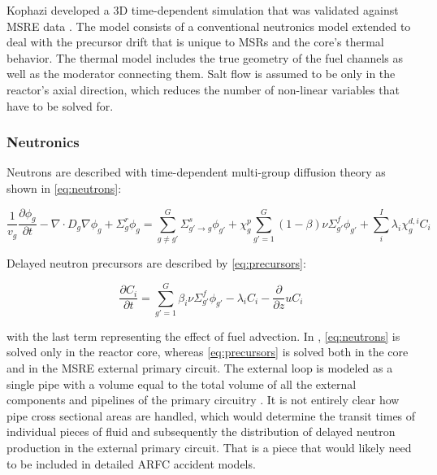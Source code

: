\documentclass{article}
\let\Oldsubsubsection\subsubsection
\renewcommand{\subsubsection}{\FloatBarrier\Oldsubsubsection}
\begin{document}
Kophazi developed a 3D time-dependent simulation that was validated against \gls{MSRE}
data \cite{kophazi_development_2009}. The model consists of a conventional
neutronics model extended to deal with the precursor drift that is unique to
MSRs and the core's thermal behavior. The thermal model includes the true
geometry of the fuel channels as well as the moderator connecting them. Salt
flow is assumed to be only in the reactor's axial direction, which reduces the
number of non-linear variables that have to be solved for.

\subsubsection{Neutronics}

Neutrons are described with time-dependent multi-group diffusion theory as shown
in \cref{eq:neutrons}:

\begin{equation}
\frac{1}{v_g}\frac{\partial \phi_g}{\partial t} - \nabla \cdot D_g \nabla \phi_g
+ \Sigma_g^r \phi_g = \sum_{g \ne g'}^G \Sigma_{g'\rightarrow g}^s \phi_{g'} + \chi_g^p \sum_{g' = 1}^G (1 - \beta)
\nu \Sigma_{g'}^f \phi_{g'} + \sum_i^I \lambda_i \chi_g^{d,i} C_i
\label{eq:neutrons}
\end{equation}

Delayed neutron precursors are described by \cref{eq:precursors}:

\begin{equation}
\frac{\partial C_i}{\partial t} = \sum_{g'= 1}^G \beta_i \nu \Sigma_{g'}^f
\phi_{g'} - \lambda_i C_i - \frac{\partial}{\partial z} u C_i
\label{eq:precursors}
\end{equation}

with the last term representing the effect of fuel advection. In
\cite{kophazi_development_2009}, \cref{eq:neutrons} is solved only in the
reactor core, whereas \cref{eq:precursors} is solved both in the core and in the
\gls{MSRE} external primary circuit. The external loop is modeled as a single pipe
with a volume equal to the total volume of all the external components and
pipelines of the primary circuitry \cite{kophazi_development_2009}. It is not
entirely clear how pipe cross sectional areas are handled, which would determine
the transit times of individual pieces of fluid and subsequently the
distribution of delayed neutron production in the external primary circuit. That
is a piece that would likely need to be included in detailed ARFC accident
models.
\end{document}
